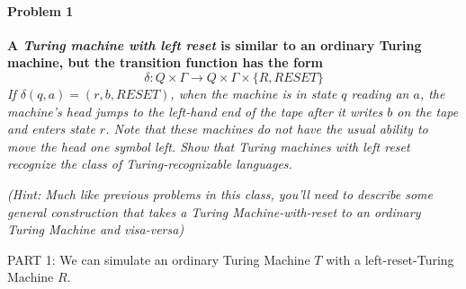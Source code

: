 \documentclass{article}
\begin{document}
\paragraph{Problem 1}
 \textbf{A {\em Turing machine with left reset} is similar to an ordinary Turing machine, but the transition function has the form}
  \begin{displaymath}
    \delta : Q \times \Gamma \to Q \times \Gamma \times \{R,RESET\}
  \end{displaymath}
\textit{If $\delta (q,a) = (r,b,RESET)$, when the machine is in state $q$ reading an $a$, the machine's head jumps to the left-hand end of the tape after it writes $b$ on the tape and enters state $r$. Note that these machines do not have the usual ability to move the head one symbol left. 
Show that Turing machines with left reset recognize the class of Turing-recognizable languages.}

  \textit{(Hint: Much like previous problems in this class, you'll need to describe some general construction that takes a Turing Machine-with-reset to an ordinary Turing Machine and visa-versa)} \newline \newline
  
\noindent PART 1:\newline  
  \noindent We can simulate an ordinary Turing Machine $T$ with a left-reset-Turing Machine $R$. \newline
  
\end{document}
